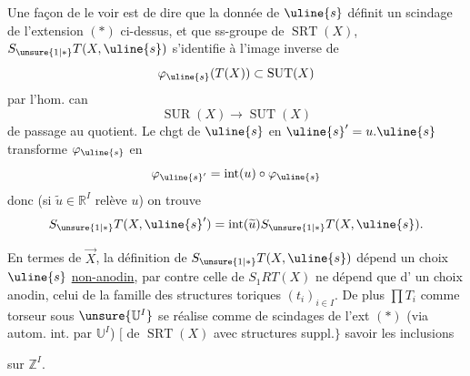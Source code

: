 
Une façon de le voir est de dire que
la donnée de $\uline{s}$ définit un scindage
 de
l'extension $(*)$ ci-dessus, et que 
ss-groupe de $\operatorname{SRT}(X)$,
$S_{\unsure{1|*}}T(X,\uline{s})$ s'identifie
à l'image inverse de
\[
\varphi_{\uline{s}}(T(X))\subset\operatorname{SUT}(X)
\]
par l'hom. can
\[
\operatorname{SUR}(X)\longrightarrow\operatorname{SUT}(X)
\]
de passage au quotient. Le chgt de
$\uline{s}$ en $\uline{s}'=u.\uline{s}$
transforme $\varphi_{\uline{s}}$ en
\[
\varphi_{\uline{s}'}=\operatorname{int}(u)\circ\varphi_{\uline{s}}
\]
donc (si $\widetilde u\in\mathbb R^I$ relève $u$) on trouve
\[
S_{\unsure{1|*}}T(X,\uline{s}')
=\operatorname{int}(\widetilde u)S_{\unsure{1|*}}T(X,\uline{s}).
\]

En termes de $\vec X$, la définition de
$S_{\unsure{1|*}}T(X,\uline{s})$
dépend un choix $\uline{s}$ \uline{non-anodin},
par contre celle de $S_1RT(X)$ ne dépend que d'
un choix anodin, celui de la famille des
structures toriques $(t_i)_{i\in I}$.
De plus $\prod T_i$ comme
torseur sous $\unsure{\mathbb U^I}$ se réalise
comme  de scindages de l'ext $(*)$
(via autom. int. par $\mathbb U^I$)
$\bigl[$ de $\operatorname{SRT}(X)$
avec  structures suppl.$\bigr\}$
savoir\unsure{)|,} les inclusions


 sur $\mathbb Z^I$.

